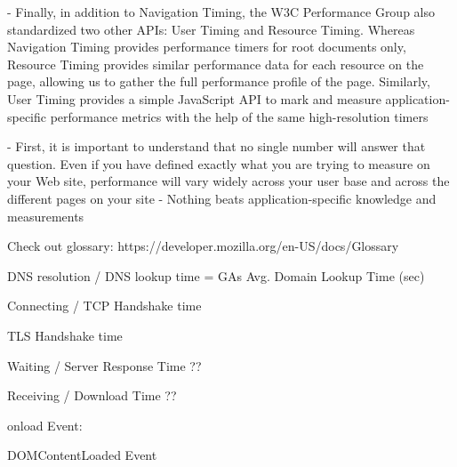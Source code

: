 - Finally, in addition to Navigation Timing, the W3C Performance Group also standardized two other APIs: User Timing and Resource Timing. Whereas Navigation Timing provides performance timers for root documents only, Resource Timing provides similar performance data for each resource on the page, allowing us to gather the full performance profile of the page. Similarly, User Timing provides a simple JavaScript API to mark and measure application-specific performance metrics with the help of the same high-resolution timers



- First, it is important to understand that no single number will answer that question. Even if you have defined exactly what you are trying to measure on your Web site, performance will vary widely across your user base and across the different pages on your site
- Nothing beats application-specific knowledge and measurements






Check out glossary: https://developer.mozilla.org/en-US/docs/Glossary



DNS resolution / DNS lookup time %
= GAs Avg. Domain Lookup Time (sec) %


Connecting / TCP Handshake time %


TLS Handshake time %


Waiting / Server Response Time ?? %


Receiving / Download Time ?? %




onload Event: %


DOMContentLoaded Event %




